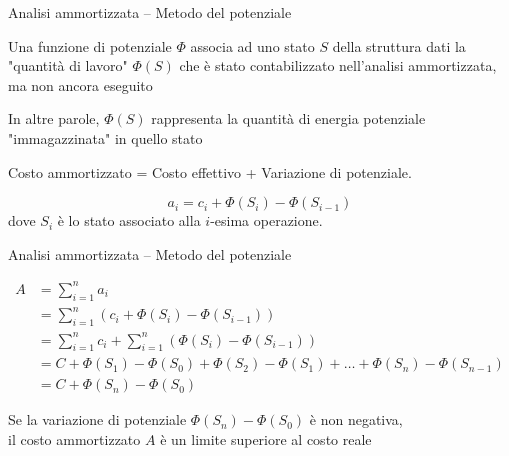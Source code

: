 \begin{frame}{Analisi ammortizzata -- Metodo del potenziale}

\vspace{-9pt}
\begin{myboxtitle}
\BIL
\item Una \alert{funzione di potenziale $\Phi$} associa ad uno \alert{stato $S$} della struttura dati la \alert{"quantità di lavoro" $\Phi(S)$} che è stato contabilizzato nell'analisi ammortizzata, ma non ancora eseguito
\item In altre parole, $\Phi(S)$ rappresenta la quantità di energia potenziale "immagazzinata" in quello stato
\EIL
\end{myboxtitle}

\begin{myboxtitle}
\alert{Costo ammortizzato} = \alert{Costo effettivo} + \alert{Variazione di potenziale}.

\[
  a_i = c_i + \Phi(S_i) - \Phi(S_{i-1})
\]
dove $S_i$ è lo stato associato alla $i$-esima operazione.
\end{myboxtitle}

\end{frame}

\begin{frame}{Analisi ammortizzata -- Metodo del potenziale}

\vspace{-3pt}
\begin{align*}
  A &= \sum_{i=1}^n a_i \\
    &= \sum_{i=1}^n \left(c_i + \Phi(S_i) - \Phi(S_{i-1}) \right) \\
    &= \sum_{i=1}^n c_i + \sum_{i=1}^n \left(\Phi(S_i) - \Phi(S_{i-1}) \right) \\
    &= C + \Phi(S_1) - \Phi(S_0) + \Phi(S_2) - \Phi(S_1) + \ldots + \Phi(S_n) - \Phi(S_{n-1}) \\
    &= C + \Phi(S_n) - \Phi(S_0)
\end{align*}

\vspace{-6pt}
Se la variazione di potenziale $\Phi(S_n) - \Phi(S_0)$ è non negativa,\\
\alert{il costo ammortizzato $A$ è un limite superiore al costo reale}
\end{frame}

